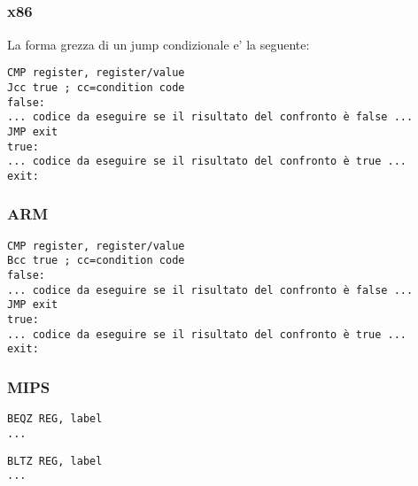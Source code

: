 \label{sec:Jcc}






\subsection{\Conclusion{}}

\subsubsection{x86}

La forma grezza di un jump condizionale e' la seguente:

\begin{lstlisting}[caption=x86,style=customasmx86]
CMP register, register/value
Jcc true ; cc=condition code
false:
... codice da eseguire se il risultato del confronto è false ...
JMP exit 
true:
... codice da eseguire se il risultato del confronto è true ...
exit:
\end{lstlisting}

\subsubsection{ARM}

\begin{lstlisting}[caption=ARM,style=customasmARM]
CMP register, register/value
Bcc true ; cc=condition code
false:
... codice da eseguire se il risultato del confronto è false ...
JMP exit 
true:
... codice da eseguire se il risultato del confronto è true ...
exit:
\end{lstlisting}

\subsubsection{MIPS}

\begin{lstlisting}[caption=Check for zero,style=customasmMIPS]
BEQZ REG, label
...
\end{lstlisting}

\begin{lstlisting}[caption=Check for less than zero (using pseudoinstruction),style=customasmMIPS]
BLTZ REG, label
...
\end{lstlisting}

